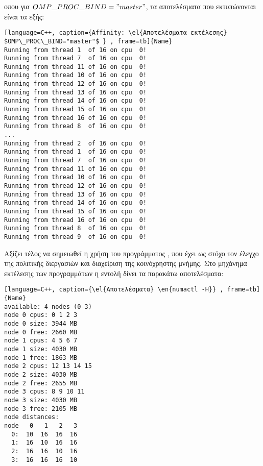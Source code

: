 οπου για $OMP\_PROC\_BIND="master"$, τα αποτελέσματα που εκτυπώνονται είναι τα εξής:
\ \\
\begin{spacing}{0.8}
\begin{lstlisting}[language=C++, caption={Affinity: \el{Αποτελέσματα εκτέλεσης} $OMP\_PROC\_BIND="master"$ } , frame=tb]{Name}
Running from thread 1  of 16 on cpu  0!
Running from thread 7  of 16 on cpu  0!
Running from thread 11 of 16 on cpu  0!
Running from thread 10 of 16 on cpu  0!
Running from thread 12 of 16 on cpu  0!
Running from thread 13 of 16 on cpu  0!
Running from thread 14 of 16 on cpu  0!
Running from thread 15 of 16 on cpu  0!
Running from thread 16 of 16 on cpu  0!
Running from thread 8  of 16 on cpu  0!
...
Running from thread 2  of 16 on cpu  0!
Running from thread 1  of 16 on cpu  0!
Running from thread 7  of 16 on cpu  0!
Running from thread 11 of 16 on cpu  0!
Running from thread 10 of 16 on cpu  0!
Running from thread 12 of 16 on cpu  0!
Running from thread 13 of 16 on cpu  0!
Running from thread 14 of 16 on cpu  0!
Running from thread 15 of 16 on cpu  0!
Running from thread 16 of 16 on cpu  0!
Running from thread 8  of 16 on cpu  0!
Running from thread 9  of 16 on cpu  0!

\end{lstlisting}
\end{spacing}


Αξίζει τέλος να σημειωθεί η χρήση του προγράμματος , που έχει ως στόχο τον έλεγχο της πολιτικής διεργασιών και διαχείριση της κοινόχρηστης μνήμης. Στο μηχάνημα εκτέλεσης των προγραμμάτων η εντολή  δίνει τα παρακάτω αποτελέσματα:

\begin{spacing}{0.8}
\begin{lstlisting}[language=C++, caption={\el{Αποτελέσματα} \en{numactl -H}} , frame=tb]{Name}
available: 4 nodes (0-3)
node 0 cpus: 0 1 2 3
node 0 size: 3944 MB
node 0 free: 2660 MB
node 1 cpus: 4 5 6 7
node 1 size: 4030 MB
node 1 free: 1863 MB
node 2 cpus: 12 13 14 15
node 2 size: 4030 MB
node 2 free: 2655 MB
node 3 cpus: 8 9 10 11
node 3 size: 4030 MB
node 3 free: 2105 MB
node distances:
node   0   1   2   3
  0:  10  16  16  16
  1:  16  10  16  16
  2:  16  16  10  16
  3:  16  16  16  10
\end{lstlisting}
\end{spacing}


